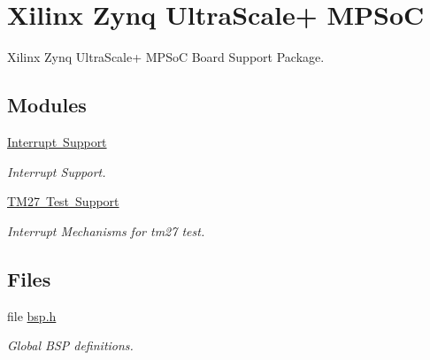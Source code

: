 \hypertarget{group__RTEMSBSPsARMZynqMP}{}\section{Xilinx Zynq Ultra\+Scale+ M\+P\+SoC}
\label{group__RTEMSBSPsARMZynqMP}


Xilinx Zynq Ultra\+Scale+ M\+P\+SoC Board Support Package.  


\subsection*{Modules}
\begin{DoxyCompactItemize}
\item 
\mbox{\hyperlink{group__zynqmp__interrupt}{Interrupt Support}}
\begin{DoxyCompactList}\small\item\em Interrupt Support. \end{DoxyCompactList}\item 
\mbox{\hyperlink{group__zynqmp__tm27}{T\+M27 Test Support}}
\begin{DoxyCompactList}\small\item\em Interrupt Mechanisms for tm27 test. \end{DoxyCompactList}\end{DoxyCompactItemize}
\subsection*{Files}
\begin{DoxyCompactItemize}
\item 
file \mbox{\hyperlink{bsps_2arm_2xilinx-zynqmp_2include_2bsp_8h}{bsp.\+h}}
\begin{DoxyCompactList}\small\item\em Global B\+SP definitions. \end{DoxyCompactList}\end{DoxyCompactItemize}
